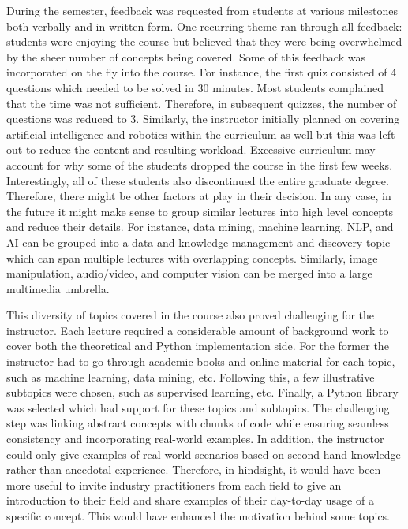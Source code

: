 \documentclass[letterpaper,twocolumn,10pt]{article}
\begin{document}
During the semester, feedback was requested from students at various milestones
both verbally and in written form. One recurring theme ran through all feedback:
students were enjoying the course but believed that they were being overwhelmed
by the sheer number of concepts being covered. Some of this feedback was
incorporated on the fly into the course. For instance, the first quiz consisted
of 4 questions which needed to be solved in 30 minutes. Most students complained
that the time was not sufficient. Therefore, in subsequent quizzes, the number
of questions was reduced to 3. Similarly, the instructor initially planned on
covering artificial intelligence and robotics within the curriculum as well but
this was left out to reduce the content and resulting workload. Excessive
curriculum may account for why some of the students dropped the course in the
first few weeks. Interestingly, all of these students also discontinued the
entire graduate degree. Therefore, there might be other factors at play in their
decision. In any case, in the future it might make sense to group similar
lectures into high level concepts and reduce their details. For instance, data
mining, machine learning, NLP, and AI can be grouped into a data and knowledge
management and discovery topic which can span multiple lectures with overlapping
concepts. Similarly, image manipulation, audio/video, and computer vision can be
merged into a large multimedia umbrella.

This diversity of topics covered in the course also proved challenging for the
instructor. Each lecture required a considerable amount of background work to
cover both the theoretical and Python implementation side. For the former the
instructor had to go through academic books and online material for each topic,
such as machine learning, data mining, etc. Following this, a few illustrative
subtopics were chosen, such as supervised learning, etc. Finally, a Python
library was selected which had support for these topics and subtopics. The
challenging step was linking abstract concepts with chunks of code while
ensuring seamless consistency and incorporating real-world examples. In
addition, the instructor could only give examples of real-world scenarios based
on second-hand knowledge rather than anecdotal experience. Therefore, in
hindsight, it would have been more useful to invite industry practitioners from
each field to give an introduction to their field and share examples of their
day-to-day usage of a specific concept. This would have enhanced the motivation
behind some topics.
\end{document}
